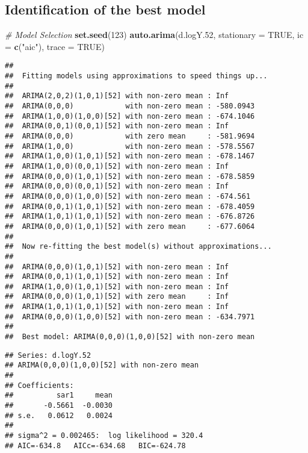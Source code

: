 \documentclass[
]{article}
\newenvironment{Shaded}{\begin{snugshade}}{\end{snugshade}}
\newcommand{\AttributeTok}[1]{\textcolor[rgb]{0.13,0.29,0.53}{#1}}
\newcommand{\CommentTok}[1]{\textcolor[rgb]{0.56,0.35,0.01}{\textit{#1}}}
\newcommand{\ConstantTok}[1]{\textcolor[rgb]{0.56,0.35,0.01}{#1}}
\newcommand{\DecValTok}[1]{\textcolor[rgb]{0.00,0.00,0.81}{#1}}
\newcommand{\FloatTok}[1]{\textcolor[rgb]{0.00,0.00,0.81}{#1}}
\newcommand{\FunctionTok}[1]{\textcolor[rgb]{0.13,0.29,0.53}{\textbf{#1}}}
\newcommand{\NormalTok}[1]{#1}
\newcommand{\StringTok}[1]{\textcolor[rgb]{0.31,0.60,0.02}{#1}}
\begin{document}
\hypertarget{identification-of-the-best-model-1}{%
\subsection{Identification of the best
model}\label{identification-of-the-best-model-1}}

\begin{Shaded}
\begin{Highlighting}[]
\CommentTok{\# Model Selection}
\FunctionTok{set.seed}\NormalTok{(}\DecValTok{123}\NormalTok{)}
\FunctionTok{auto.arima}\NormalTok{(d.logY}\FloatTok{.52}\NormalTok{, }\AttributeTok{stationary =} \ConstantTok{TRUE}\NormalTok{, }\AttributeTok{ic =} \FunctionTok{c}\NormalTok{(}\StringTok{"aic"}\NormalTok{), }\AttributeTok{trace =} \ConstantTok{TRUE}\NormalTok{)}
\end{Highlighting}
\end{Shaded}

\begin{verbatim}
## 
##  Fitting models using approximations to speed things up...
## 
##  ARIMA(2,0,2)(1,0,1)[52] with non-zero mean : Inf
##  ARIMA(0,0,0)            with non-zero mean : -580.0943
##  ARIMA(1,0,0)(1,0,0)[52] with non-zero mean : -674.1046
##  ARIMA(0,0,1)(0,0,1)[52] with non-zero mean : Inf
##  ARIMA(0,0,0)            with zero mean     : -581.9694
##  ARIMA(1,0,0)            with non-zero mean : -578.5567
##  ARIMA(1,0,0)(1,0,1)[52] with non-zero mean : -678.1467
##  ARIMA(1,0,0)(0,0,1)[52] with non-zero mean : Inf
##  ARIMA(0,0,0)(1,0,1)[52] with non-zero mean : -678.5859
##  ARIMA(0,0,0)(0,0,1)[52] with non-zero mean : Inf
##  ARIMA(0,0,0)(1,0,0)[52] with non-zero mean : -674.561
##  ARIMA(0,0,1)(1,0,1)[52] with non-zero mean : -678.4059
##  ARIMA(1,0,1)(1,0,1)[52] with non-zero mean : -676.8726
##  ARIMA(0,0,0)(1,0,1)[52] with zero mean     : -677.6064
## 
##  Now re-fitting the best model(s) without approximations...
## 
##  ARIMA(0,0,0)(1,0,1)[52] with non-zero mean : Inf
##  ARIMA(0,0,1)(1,0,1)[52] with non-zero mean : Inf
##  ARIMA(1,0,0)(1,0,1)[52] with non-zero mean : Inf
##  ARIMA(0,0,0)(1,0,1)[52] with zero mean     : Inf
##  ARIMA(1,0,1)(1,0,1)[52] with non-zero mean : Inf
##  ARIMA(0,0,0)(1,0,0)[52] with non-zero mean : -634.7971
## 
##  Best model: ARIMA(0,0,0)(1,0,0)[52] with non-zero mean
\end{verbatim}

\begin{verbatim}
## Series: d.logY.52 
## ARIMA(0,0,0)(1,0,0)[52] with non-zero mean 
## 
## Coefficients:
##          sar1     mean
##       -0.5661  -0.0030
## s.e.   0.0612   0.0024
## 
## sigma^2 = 0.002465:  log likelihood = 320.4
## AIC=-634.8   AICc=-634.68   BIC=-624.78
\end{verbatim}
\end{document}

